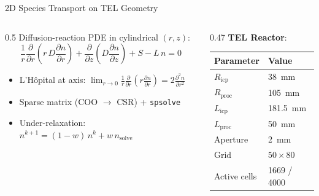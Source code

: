 \documentclass[aspectratio=169,10pt]{beamer}
\begin{document}
\begin{frame}{2D Species Transport on TEL Geometry}
  \begin{columns}[T]
    \begin{column}{0.5\textwidth}
      Diffusion-reaction PDE in cylindrical $(r,z)$:
      \[
        \frac{1}{r}\frac{\partial}{\partial r}\!\left(r\,D\frac{\partial n}{\partial r}\right)
        + \frac{\partial}{\partial z}\!\left(D\frac{\partial n}{\partial z}\right) + S - L\,n = 0
      \]
      \begin{itemize}[]
        \item L'H\^opital at axis: $\lim_{r\to0}\frac{1}{r}\frac{\partial}{\partial r}(r\frac{\partial n}{\partial r}) = 2\frac{\partial^2 n}{\partial r^2}$
        \item Sparse matrix (COO $\to$ CSR) + \texttt{spsolve}
        \item Under-relaxation: $n^{k+1} = (1{-}w)\,n^k + w\,n_\text{solve}$
      \end{itemize}
    \end{column}
    \begin{column}{0.47\textwidth}
      \centering
      \textbf{TEL Reactor}:\\[4pt]
      \footnotesize
      \begin{tabular}{@{}ll@{}}
        \toprule
        Parameter & Value \\
        \midrule
        $R_\text{icp}$ & \SI{38}{\milli\meter} \\
        $R_\text{proc}$ & \SI{105}{\milli\meter} \\
        $L_\text{icp}$ & \SI{181.5}{\milli\meter} \\
        $L_\text{proc}$ & \SI{50}{\milli\meter} \\
        Aperture & \SI{2}{\milli\meter} \\
        Grid & $50\times80$ \\
        Active cells & 1669 / 4000 \\
        \bottomrule
      \end{tabular}
    \end{column}
  \end{columns}
\end{frame}
\end{document}
